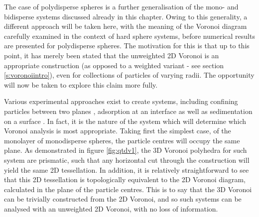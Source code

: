 The case of \qtd{} polydisperse spheres is a further generalisation of the mono\-- and bidisperse systems discussed already in this chapter.
Owing to this generality, a different approach will be taken here, with the meaning of the Voronoi diagram carefully examined in the context of \qtd{} hard sphere systems, before numerical results are presented for polydisperse spheres.
The motivation for this is that up to this point, it has merely been stated that the unweighted 2D Voronoi is an appropriate construction (as opposed to a weighted variant - see section \ref{s:voronoiintro}), even for collections of particles of varying radii.
The opportunity will now be taken to explore this claim more fully.

Various experimental approaches exist to create \qtd{} systems, including confining particles between two planes \cite{Marcus1997,Weikai2014}, adsorption at an interface \cite{Peng2009,Vogel2014} as well as sedimentation on a surface \cite{Tamborini2015,Thorneywork2018}.
In fact, it is the nature of the system which will determine which Voronoi analysis is most appropriate.
Taking first the simplest \qtd{} case, of the monolayer of monodisperse spheres, the particle centres will occupy the same plane.
As demonstrated in figure \ref{fig:qtdv1}, the 3D Voronoi polyhedra for such system are prismatic, such that any horizontal cut through the construction will yield the same 2D tessellation. 
In addition, it is relatively straightforward to see that this 2D tessellation is topologically equivalent to the 2D Voronoi diagram, calculated in the plane of the particle centres.
This is to say that the 3D Voronoi can be trivially constructed from the 2D Voronoi, and so such systems can be analysed with an unweighted 2D Voronoi, with no loss of information.

